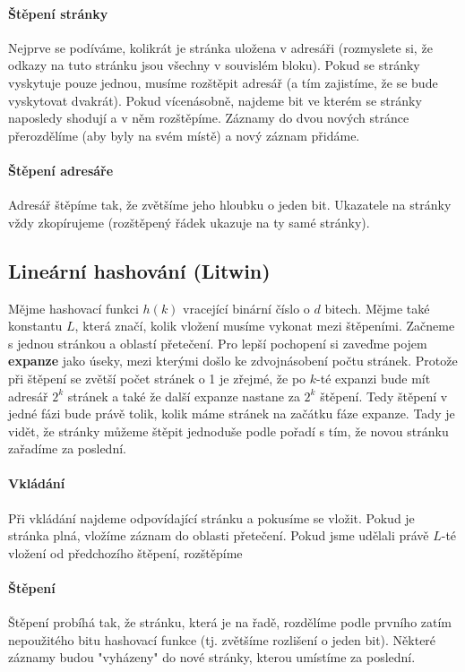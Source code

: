 \documentclass[a4paper,12pt]{article}
\begin{document}
\paragraph{Štěpení stránky}
Nejprve se podíváme, kolikrát je stránka uložena v adresáři (rozmyslete si, že 
odkazy na tuto stránku jsou všechny v souvislém bloku). Pokud se stránky 
vyskytuje pouze jednou, musíme rozštěpit adresář (a tím zajistíme, že se bude 
vyskytovat dvakrát).  Pokud vícenásobně, najdeme bit ve kterém se stránky 
naposledy shodují a v něm rozštěpíme. Záznamy do dvou nových stránce
přerozdělíme (aby byly na svém místě) a nový záznam přidáme.

\paragraph{Štěpení adresáře}
Adresář štěpíme tak, že zvětšíme jeho hloubku o jeden bit. Ukazatele na stránky 
vždy zkopírujeme (rozštěpený řádek ukazuje na ty samé stránky).


\subsection{Lineární hashování (Litwin)}
\setcounter{equation}{0}
Mějme hashovací funkci $h(k)$ vracející binární číslo o $d$ bitech. Mějme také 
konstantu $L$, která značí, kolik vložení musíme vykonat mezi štěpeními. Začneme 
s jednou stránkou a oblastí přetečení. Pro lepší pochopení si zaveďme pojem 
\textbf{expanze} jako úseky, mezi kterými došlo ke zdvojnásobení počtu stránek.  
Protože při štěpení se zvětší počet stránek o 1 je zřejmé, že po $k$-té expanzi 
bude mít adresář $2^k$ stránek a také že další expanze nastane za $2^k$ štěpení.  
Tedy štěpení v jedné fázi bude právě tolik, kolik máme stránek na začátku fáze 
expanze. Tady je vidět, že stránky můžeme štěpit jednoduše podle pořadí s tím, 
že novou stránku zařadíme za poslední.

\paragraph{Vkládání}
Při vkládání najdeme odpovídající stránku a pokusíme se vložit. Pokud je stránka 
plná, vložíme záznam do oblasti přetečení. Pokud jsme udělali právě $L$-té 
vložení od předchozího štěpení, rozštěpíme

\paragraph{Štěpení}
Štěpení probíhá tak, že stránku, která je na řadě, rozdělíme podle prvního zatím 
nepoužitého bitu hashovací funkce (tj. zvětšíme rozlišení o jeden bit). Některé 
záznamy budou "vyházeny" do nové stránky, kterou umístíme za poslední.
\end{document}
